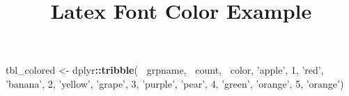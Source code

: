 \documentclass[]{article}
\title{Latex Font Color Example}
\author{}
\date{\vspace{-2.5em}}
\newenvironment{Shaded}{\begin{snugshade}}{\end{snugshade}}
\newcommand{\DecValTok}[1]{\textcolor[rgb]{0.00,0.00,0.81}{#1}}
\newcommand{\KeywordTok}[1]{\textcolor[rgb]{0.13,0.29,0.53}{\textbf{#1}}}
\newcommand{\NormalTok}[1]{#1}
\newcommand{\OperatorTok}[1]{\textcolor[rgb]{0.81,0.36,0.00}{\textbf{#1}}}
\newcommand{\StringTok}[1]{\textcolor[rgb]{0.31,0.60,0.02}{#1}}
\begin{document}
\maketitle

\begin{Shaded}
\begin{Highlighting}[]
\NormalTok{tbl_colored <-}\StringTok{ }\NormalTok{dplyr}\OperatorTok{::}\KeywordTok{tribble}\NormalTok{( }\OperatorTok{~}\NormalTok{grpname, }\OperatorTok{~}\NormalTok{count, }\OperatorTok{~}\NormalTok{color,}
                               \StringTok{'apple'}\NormalTok{, }\DecValTok{1}\NormalTok{, }\StringTok{'red'}\NormalTok{,}
                               \StringTok{'banana'}\NormalTok{, }\DecValTok{2}\NormalTok{, }\StringTok{'yellow'}\NormalTok{,}
                               \StringTok{'grape'}\NormalTok{, }\DecValTok{3}\NormalTok{, }\StringTok{'purple'}\NormalTok{,}
                               \StringTok{'pear'}\NormalTok{, }\DecValTok{4}\NormalTok{, }\StringTok{'green'}\NormalTok{,}
                               \StringTok{'orange'}\NormalTok{, }\DecValTok{5}\NormalTok{, }\StringTok{'orange'}\NormalTok{)}


\end{Highlighting}
\end{Shaded}
\end{document}
